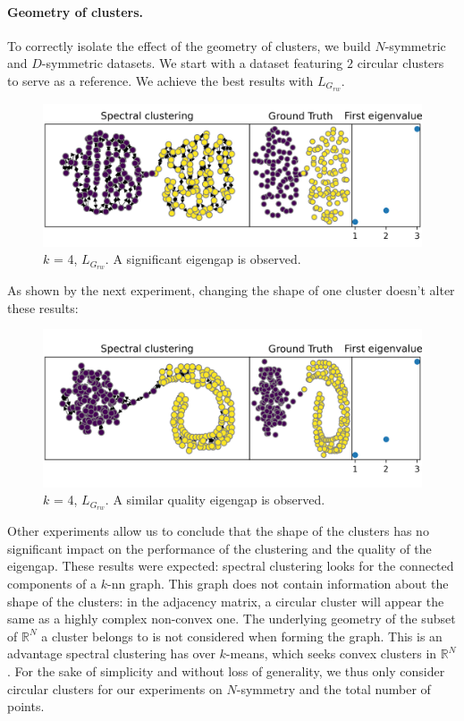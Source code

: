 \documentclass[a4paper,12pt]{article}
\theoremstyle{definition}
\theoremstyle{plain}
\begin{document}
\paragraph{Geometry of clusters.}
To correctly isolate the effect of the geometry of clusters, we build $N$-symmetric and $D$-symmetric datasets. We start with a dataset featuring $2$ circular clusters to serve as a reference. We achieve the best results with $L_{G_{rw}}$.
\begin{figure}[H]
	\centering
	\includegraphics[width=0.6\linewidth]{figures/base_circles_g_rw}
	\caption{$k$ = 4, $L_{G_{rw}}$. A significant eigengap is observed.}
	\label{fig:base_circles}
\end{figure}
As shown by the next experiment, changing the shape of one cluster doesn't alter these results:
\begin{figure}[H]
	\centering
	\includegraphics[width=0.6\linewidth]{figures/uneven_blobs_g_rw}
	\caption{$k$ = 4, $L_{G_{rw}}$. A similar quality eigengap is observed.}
	\label{fig:uneven_blobs}
\end{figure}

Other experiments allow us to conclude that the shape of the clusters has no significant impact on the performance of the clustering and the quality of the eigengap. These results were expected: spectral clustering looks for the connected components of a $k$-nn graph. This graph does not contain information about the shape of the clusters: in the adjacency matrix, a circular cluster will appear the same as a highly complex non-convex one. The underlying geometry of the subset of $\mathbb{R}^N$ a cluster belongs to is not considered when forming the graph. This is an advantage spectral clustering has over $k$-means, which seeks convex clusters in $\mathbb{R}^N$. For the sake of simplicity and without loss of generality, we thus only consider circular clusters for our experiments on $N$-symmetry and the total number of points.
\end{document}

